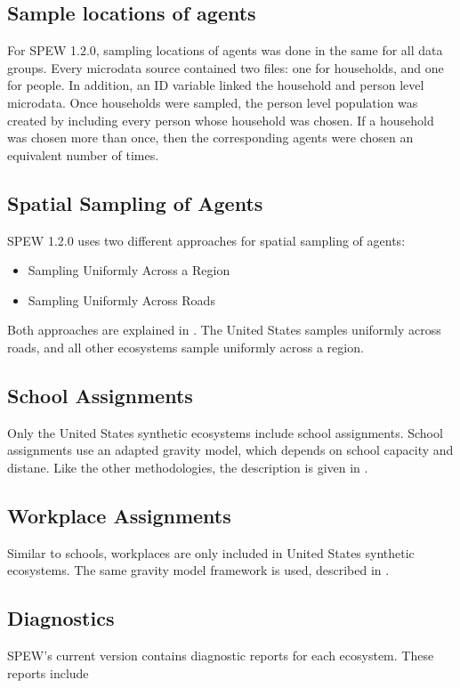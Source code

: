 \documentclass[font=9pt]{article}
\begin{document}
\subsection{Sample locations of agents}
For SPEW 1.2.0, sampling locations of agents was done in the same for all data groups. Every microdata source contained two files: one for households, and one for people. In addition, an ID variable linked the household and person level microdata. Once households were sampled, the person level population was created by including every person whose household was chosen. If a household was chosen more than once, then the corresponding agents were chosen an equivalent number of times. 

\subsection{Spatial Sampling of Agents}
SPEW 1.2.0 uses two different approaches for spatial sampling of agents:

\begin{itemize}
	\item Sampling Uniformly Across a Region
	\item Sampling Uniformly Across Roads
\end{itemize}

Both approaches are explained in \cite{spew}. The United States samples uniformly across roads, and all other ecosystems sample uniformly across a region.

\subsection{School Assignments}
Only the United States synthetic ecosystems include school assignments. School assignments use an adapted gravity model, which depends on school capacity and distane. Like the other methodologies, the description is given in \cite{spew}. 

\subsection{Workplace Assignments}
Similar to schools, workplaces are only included in United States synthetic ecosystems. The same gravity model framework is used, described in \cite{spew}. 

\subsection{Diagnostics}
SPEW's current version contains diagnostic reports for each ecosystem. These reports include
\end{document}
